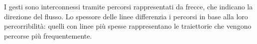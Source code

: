 \documentclass{book}
\begin{document}
\null
\quad  %

\null
\quad  %



\begin{minipage}{0.2\textwidth}
\end{minipage}%
\begin{minipage}{0.6\textwidth}
\justify I gesti sono interconnessi tramite percorsi rappresentati da frecce, che indicano la direzione del flusso. Lo spessore delle linee differenzia i percorsi in base alla loro percorribilità: quelli con linee più spesse rappresentano le traiettorie che vengono percorse più frequentemente.
\end{minipage}

\null
\quad  %

\null
\quad  %
\end{document}
